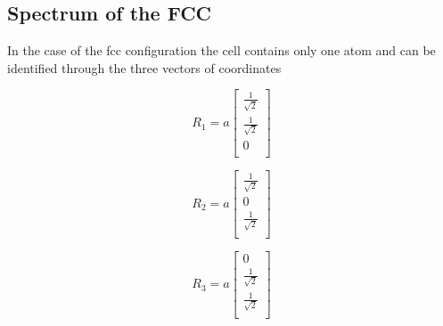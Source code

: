 \documentclass[a4paper]{article}
\begin{document}
    \subsection{Spectrum of the FCC}

    In the case of the fcc configuration the cell contains only one atom and can be identified through the three vectors of coordinates\\
    \begin{minipage}{0.3\textwidth}
    \centering
    \begin{equation*}
    R_1 = a
    \begin{bmatrix}
        \frac{1}{\sqrt{2}} \\
        \frac{1}{\sqrt{2}} \\
        0 \\
        
    \end{bmatrix}
    \end{equation*}
    
    \end{minipage}
    \begin{minipage}{0.3\textwidth}
    \centering
    \begin{equation*}
    R_2 = a
    \begin{bmatrix}
        \frac{1}{\sqrt{2}} \\
        0 \\
        \frac{1}{\sqrt{2}} \\
    \end{bmatrix}
    \end{equation*}
    \end{minipage}
    \begin{minipage}{0.3\textwidth}
    \centering
    \begin{equation*}
    R_3 = a
    \begin{bmatrix}
        0 \\
        \frac{1}{\sqrt{2}}  \\
        \frac{1}{\sqrt{2}} \\
    \end{bmatrix}
    \end{equation*}
    \end{minipage}
    
    
    
\end{document}
